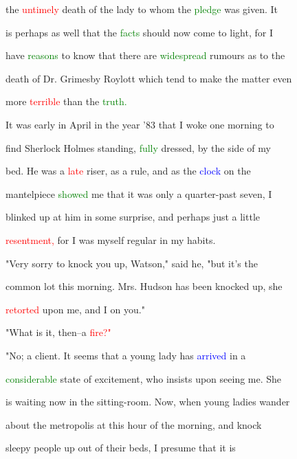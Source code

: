  the \textcolor{red}{untimely} \textcolor{BurntOrange}{death} of the lady to whom the \textcolor{green}{pledge} was given. It

 is perhaps as well that the \textcolor{green}{facts} should now come to light, for I

 have \textcolor{green}{reasons} to know that there are \textcolor{green}{widespread} rumours as to the

 \textcolor{BurntOrange}{death} of Dr. Grimesby Roylott which tend to make the matter even

 more \textcolor{red}{terrible} than the \textcolor{green}{truth.}



 It was early in April in the year '83 that I woke one morning to

 find Sherlock Holmes standing, \textcolor{green}{fully} dressed, by the side of my

 bed. He was a \textcolor{red}{late} riser, as a \textcolor{BurntOrange}{rule,} and as the \textcolor{blue}{clock} on the

 mantelpiece \textcolor{green}{showed} me that it was only a quarter-past seven, I

 blinked up at him in some \textcolor{BurntOrange}{surprise,} and perhaps just a little

 \textcolor{red}{resentment,} for I was myself regular in my habits.



 "Very sorry to knock you up, Watson," said he, "but it's the

 common lot this morning. Mrs. Hudson has been knocked up, she

 \textcolor{red}{retorted} upon me, and I on you."



 "What is it, then--a \textcolor{red}{fire?"}



 "No; a client. It seems that a \textcolor{BurntOrange}{young} lady has \textcolor{blue}{arrived} in a

 \textcolor{green}{considerable} state of \textcolor{BurntOrange}{excitement,} who insists upon seeing me. She

 is \textcolor{BurntOrange}{waiting} now in the sitting-room. Now, when \textcolor{BurntOrange}{young} ladies wander

 about the metropolis at this hour of the morning, and knock

 sleepy people up out of their beds, I presume that it is

